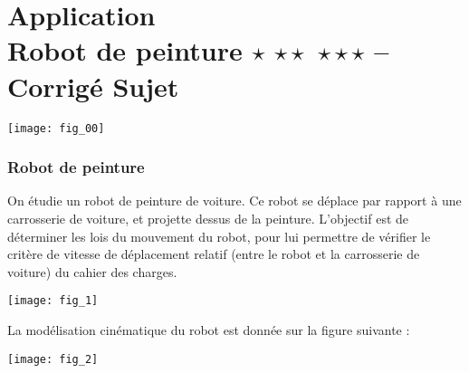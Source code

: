 \chapter*{Application  \\ 
Robot de peinture  \ifnormal $\star$ \else \fi \ifdifficile $\star\star$ \else \fi \iftdifficile $\star\star\star$ \else \fi
 -- \ifprof Corrigé \else Sujet \fi}

\iflivret {} \else
\ifprof  {} \else \fi
\fi

\setcounter{question}{0}
\marginnote[1cm]{
}

\begin{marginfigure}
\texttt{[image: fig\_00]}
\end{marginfigure}


\subsection*{Robot de peinture}

\vspace{.25cm}

On étudie un robot de peinture de voiture. Ce robot se déplace par rapport à une carrosserie de voiture, et projette dessus de la peinture. L'objectif est de déterminer les lois du mouvement du robot, pour lui permettre de vérifier le critère de vitesse de déplacement relatif (entre le robot et la carrosserie de voiture) du cahier des charges.

\begin{center}
\texttt{[image: fig\_1]}

\end{center}

\vspace{.25cm}


La modélisation cinématique du robot est donnée sur la figure suivante :


\begin{center}
\texttt{[image: fig\_2]}
\end{center}



